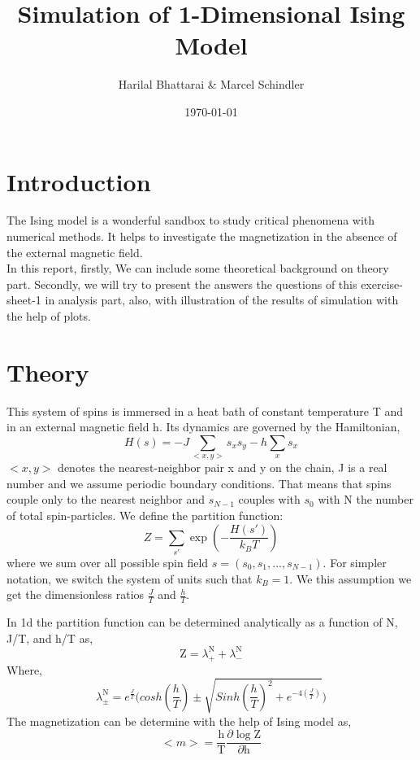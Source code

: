 \documentclass[11pt, a4paper, DIV=12]{scrartcl}
\title{Simulation of 1-Dimensional Ising Model}
\date{\today}
\author{Harilal Bhattarai \& Marcel Schindler}
\begin{document}
	\maketitle
	
\section{Introduction}
The Ising model is a wonderful sandbox to study critical phenomena with numerical methods. It helps to investigate the magnetization in the absence of the external magnetic field.\\

In this report, firstly, We can include some theoretical background on theory part. Secondly, we will try to present the answers the questions of this exercise-sheet-1 in analysis part, also, with illustration of the results of simulation with the help of plots.  

\section{Theory}

This system of spins is immersed in a heat bath of constant temperature T and in an external magnetic field h. Its dynamics are governed by the Hamiltonian,
\begin{equation}
H(s)= -J \sum_{<x,y>}s_{x}s_{y} - h \sum_{x}s_{x}
\end{equation}
$ <x,y> $ denotes the nearest-neighbor pair x and y on the chain, J is a real number and we assume periodic boundary conditions. That means that spins couple only to the nearest neighbor and $s_{N-1}$ couples with $s_0$ with N the number of total spin-particles. We define the partition function:
\begin{equation}
	Z= \sum_{s'} \exp(-\frac{H(s')}{k_B T})
\end{equation}
where we sum over all possible spin field $s=(s_0,s_1,...,s_{N-1})$. For simpler notation, we switch the system of units such that $k_B=1$. We this assumption we get the dimensionless ratios $\frac{J}{T}$ and $\frac{h}{T}$.

In 1d the partition function can be determined analytically as a function of N, J/T, and h/T as,
\begin{equation}
\text{Z}=\lambda^{\text{N}}_{+} + \lambda^{\text{N}}_{-}
\end{equation}
Where, 
\begin{equation}
 \lambda^{\text{N}}_{\pm}= e^{\frac{J}{T}} \bigg(cosh(\frac{h}{T})\pm \sqrt{Sinh(\frac{h}{T})^2 + e^{-4(\frac{J}{T})}} \bigg) 
 \label{Equ:lambda}
	\end{equation}
The magnetization can be determine with the help of Ising model as, 
\begin{equation}
<m> = \frac{\text{h}}{\text{T}} \frac{\partial\log \text{Z}}{\partial \text{h}}
\label{equ:m}
\end{equation}  
\end{document}
